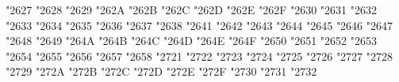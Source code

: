 {\Uchar\jis"2627 %
\Uchar\jis"2628 %
\Uchar\jis"2629 %
\Uchar\jis"262A %
\Uchar\jis"262B %
\Uchar\jis"262C %
\Uchar\jis"262D %
\Uchar\jis"262E %
\Uchar\jis"262F %
\Uchar\jis"2630 %
\Uchar\jis"2631 %
\Uchar\jis"2632 %
\Uchar\jis"2633 %
\Uchar\jis"2634 %
\Uchar\jis"2635 %
\Uchar\jis"2636 %
\Uchar\jis"2637 %
\Uchar\jis"2638 %
\Uchar\jis"2641 %
\Uchar\jis"2642 %
\Uchar\jis"2643 %
\Uchar\jis"2644 %
\Uchar\jis"2645 %
\Uchar\jis"2646 %
\Uchar\jis"2647 %
\Uchar\jis"2648 %
\Uchar\jis"2649 %
\Uchar\jis"264A %
\Uchar\jis"264B %
\Uchar\jis"264C %
\Uchar\jis"264D %
\Uchar\jis"264E %
\Uchar\jis"264F %
\Uchar\jis"2650 %
\Uchar\jis"2651 %
\Uchar\jis"2652 %
\Uchar\jis"2653 %
\Uchar\jis"2654 %
\Uchar\jis"2655 %
\Uchar\jis"2656 %
\Uchar\jis"2657 %
\Uchar\jis"2658 %
\Uchar\jis"2721 %
\Uchar\jis"2722 %
\Uchar\jis"2723 %
\Uchar\jis"2724 %
\Uchar\jis"2725 %
\Uchar\jis"2726 %
\Uchar\jis"2727 %
\Uchar\jis"2728 %
\Uchar\jis"2729 %
\Uchar\jis"272A %
\Uchar\jis"272B %
\Uchar\jis"272C %
\Uchar\jis"272D %
\Uchar\jis"272E %
\Uchar\jis"272F %
\Uchar\jis"2730 %
\Uchar\jis"2731 %
\Uchar\jis"2732 %
}
